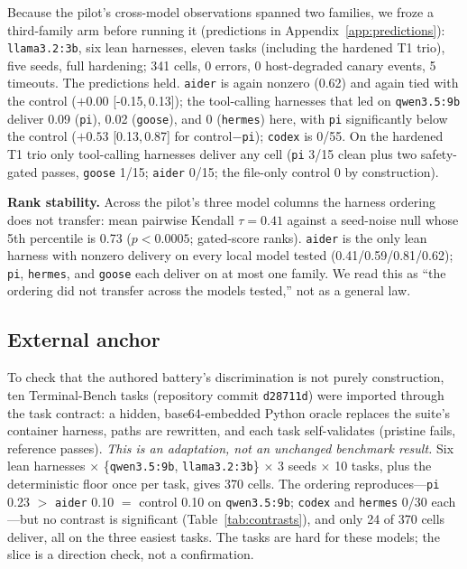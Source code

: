 \documentclass[10pt]{article}
\newcommand{\ci}[2]{[#1,\,#2]}
\begin{document}
Because the pilot's cross-model observations spanned two families, we froze a third-family arm
before running it (predictions in Appendix~\ref{app:predictions}): \texttt{llama3.2:3b}, six lean
harnesses, eleven tasks (including the hardened T1 trio), five seeds, full hardening; 341 cells, 0
errors, 0 host-degraded canary events, 5 timeouts. The predictions held. \texttt{aider} is again
nonzero (0.62) and again tied with the control ($+0.00$ \ci{-0.15}{0.13}); the tool-calling
harnesses that led on \texttt{qwen3.5:9b} deliver 0.09 (\texttt{pi}), 0.02 (\texttt{goose}), and 0
(\texttt{hermes}) here, with \texttt{pi} significantly below the control ($+0.53$ \ci{0.13}{0.87}
for control$-$\texttt{pi}); \texttt{codex} is 0/55. On the hardened T1 trio only tool-calling
harnesses deliver any cell (\texttt{pi} 3/15 clean plus two safety-gated passes, \texttt{goose}
1/15; \texttt{aider} 0/15; the file-only control 0 by construction).

\textbf{Rank stability.} Across the pilot's three model columns the harness ordering does not
transfer: mean pairwise Kendall $\tau{=}0.41$ against a seed-noise null whose 5th percentile is
0.73 ($p<0.0005$; gated-score ranks). \texttt{aider} is the only lean harness with nonzero delivery
on every local model tested (0.41/0.59/0.81/0.62); \texttt{pi}, \texttt{hermes}, and \texttt{goose}
each deliver on at most one family. We read this as ``the ordering did not transfer across the
models tested,'' not as a general law.

\subsection{External anchor}
\label{sec:anchor}

To check that the authored battery's discrimination is not purely construction, ten Terminal-Bench
tasks \citep{terminalbench} (repository commit \texttt{d28711d}) were imported through the task
contract: a hidden, base64-embedded Python oracle replaces the suite's container harness, paths are
rewritten, and each task self-validates (pristine fails, reference passes). \emph{This is an
adaptation, not an unchanged benchmark result.} Six lean harnesses $\times$
\{\texttt{qwen3.5:9b}, \texttt{llama3.2:3b}\} $\times$ 3 seeds $\times$ 10 tasks, plus the
deterministic floor once per task, gives 370 cells. The ordering reproduces---\texttt{pi} 0.23 $>$
\texttt{aider} 0.10 $=$ control 0.10 on \texttt{qwen3.5:9b}; \texttt{codex} and \texttt{hermes} 0/30
each---but no contrast is significant (Table~\ref{tab:contrasts}), and only 24 of 370 cells deliver,
all on the three easiest tasks. The tasks are hard for these models; the slice is a direction check,
not a confirmation.
\end{document}
